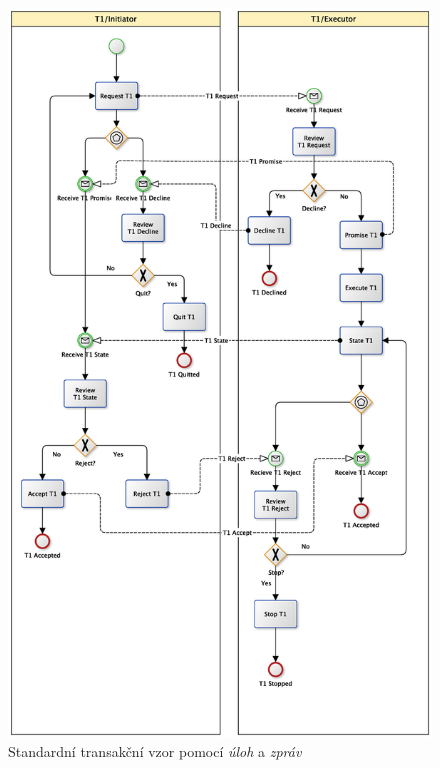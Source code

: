 \documentclass[]{article}
\begin{document}
\begin{figure}[H]\centering
\includegraphics[width=\textwidth,height=\textheight,keepaspectratio]{obrazky/transaction-standard-messages-1}
\caption{Standardní transakční vzor pomocí \textit{úloh} a \textit{zpráv}}
\label{fig:St_trans_ulohy_zpravy}
\end{figure}
\end{document}
